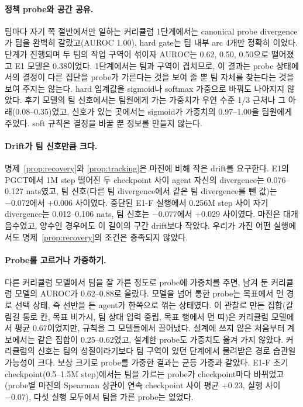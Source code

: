 \documentclass[twocolumn,10pt]{article}
\theoremstyle{remark}
\newcommand{\ours}{PGCT}
\begin{document}
\paragraph{정책 probe와 공간 공유.} 팀마다 자기 쪽 절반에서만 일하는 커리큘럼 1단계에서는 canonical probe divergence가 팀을
완벽히 갈랐고(AUROC 1.00), hard gate는 팀 내부 arc 4개만 정확히 이었다. 단계가 진행되며 두 팀의 작업 구역이 섞이자 AUROC는
0.62, 0.50, 0.50으로 떨어졌고 E1 모델은 0.38이었다. 1단계에서는 팀과 구역이 겹치므로, 이 결과는 probe 상태에서의 결정이 다른
집단을 probe가 가른다는 것을 보여 줄 뿐 팀 자체를 찾는다는 것을 보여 주지는 않는다. hard 임계값을 sigmoid나 softmax 가중으로
바꿔도 나아지지 않았다. 후기 모델의 팀 신호에서는 팀원에게 가는 가중치가 우연 수준 1/3 근처나 그 아래(0.08--0.35)였고, 신호가
있는 곳에서는 sigmoid가 가중치의 0.97--1.00을 팀원에게 주었다. soft 규칙은 결정을 바꿀 뿐 정보를 만들지 않는다.

\paragraph{Drift가 팀 신호만큼 크다.} 명제~\ref{prop:recovery}와 \ref{prop:tracking}은 마진에 비해 작은 drift를 요구한다. E1의
\ours{}에서 1M step 떨어진 두 checkpoint 사이 agent 자신의 divergence는 0.076--0.127 nats였고, 팀 신호(다른 팀 divergence에서
같은 팀 divergence를 뺀 값)는 $-0.072$에서 $+0.006$ 사이였다. 중단된 E1-F 실행에서 0.256M step 사이 자기 divergence는
0.012--0.106 nats, 팀 신호는 $-0.077$에서 $+0.029$ 사이였다. 마진은 대개 음수였고, 양수인 경우에도 이 길이의 구간 drift보다
작았다. 우리가 가진 어떤 실행에서도 명제~\ref{prop:recovery}의 조건은 충족되지 않았다.

\paragraph{Probe를 고르거나 가중하기.} 다른 커리큘럼 모델에서 팀을 잘 가른 정도로 probe에 가중치를 주면, 남겨 둔 커리큘럼 모델의
AUROC가 0.62--0.88로 올랐다. 모델을 넘어 통한 probe는 목표에서 먼 경로 선택 상태, 즉 선반을 든 agent가 한쪽으로 꺾는 상태였다. 이
관찰로 만든 집합(갈림길 통로 칸, 목표 비가시, 팀 상대 입력 중립, 목표 행에서 먼 띠)은 커리큘럼 모델에서 평균 0.67이었지만, 규칙을
그 모델들에서 끌어냈다. 설계에 쓰지 않은 처음부터 계보에서는 같은 집합이 0.25--0.62였고, 설계한 probe도 가중치도 옮겨 가지
않았다. 커리큘럼의 신호는 팀의 성질이라기보다 팀 구역이 있던 단계에서 물려받은 경로 습관일 가능성이 크다. 보상 크기로 probe를
가중한 결과는 균등 가중과 같았다. E1-F 초기 checkpoint(0.5--1.5M step)에서는 팀을 가르는 probe가 checkpoint마다 바뀌었고(probe별
마진의 Spearman 상관이 연속 checkpoint 사이 평균 $+0.23$, 실행 사이 $-0.07$), 다섯 실행 모두에서 팀을 가른 probe는 없었다.
\end{document}
